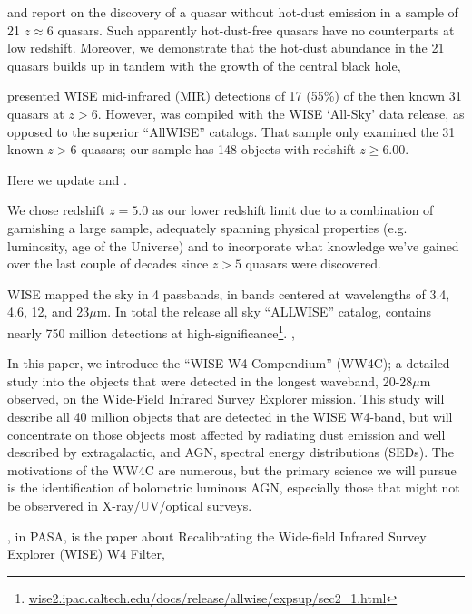 \documentclass[usenatbib]{mnras}
\begin{document}
\citet{Jiang2006dust} and \citet{Jiang2010} report on the discovery of
a quasar without hot-dust emission in a sample of 21 $z\approx6$
quasars. Such apparently hot-dust-free quasars have no counterparts at
low redshift. Moreover, we demonstrate that the hot-dust abundance in
the 21 quasars builds up in tandem with the growth of the central
black hole,

\citet{Blain2013} presented WISE mid-infrared (MIR) detections of 17
(55\%) of the then known 31 quasars at $z > 6$. However,
\citet{Blain2013} was compiled with the WISE `All-Sky' data release,
as opposed to the superior ``AllWISE'' catalogs. That sample only
examined the 31 known $z>6$ quasars; our sample has 148 objects with
redshift $z\geq6.00$.

Here we update \citet{Jiang2010}  and \citet{Blain2013} 
\citep[along with Table 8 of][]{Banados2016}. 

We chose redshift $z=5.0$ as our lower redshift limit due to a combination 
of garnishing a large sample, adequately spanning physical properties 
(e.g. luminosity, age of the Universe) and to incorporate what knowledge 
we've gained over the last couple of decades since $z>5$ quasars were 
discovered. 

WISE mapped the sky in 4 passbands, in bands centered at wavelengths of 3.4, 4.6, 12, and 23$\mu$m.  In total the release all sky ``ALLWISE'' catalog, contains nearly 750 million detections at high-significance\footnote{\href{http://wise2.ipac.caltech.edu/docs/release/allwise/expsup/sec2\_1.html}{wise2.ipac.caltech.edu/docs/release/allwise/expsup/sec2\_1.html}}. \citet{Assef2013}, \citet{Stern2012}

In this paper, we introduce the ``WISE W4 Compendium'' (WW4C); a detailed study into the objects that were detected in the longest waveband, 20-28$\mu$m observed, on the Wide-Field Infrared Survey Explorer \citep[WISE;][]{Wright2010, Cutri2013} mission. This study will describe all 40 million objects that are detected in the WISE W4-band, but will concentrate on those objects most affected by radiating dust emission and well described by extragalactic, and AGN, spectral energy distributions (SEDs).  The motivations of the WW4C are numerous, but the primary science we will pursue is the identification of bolometric luminous AGN, especially those that might not be observered in X-ray/UV/optical surveys. %

\citet{Brown2014b}, in PASA, is the paper about Recalibrating the Wide-field Infrared Survey Explorer (WISE) W4 Filter,
\end{document}
